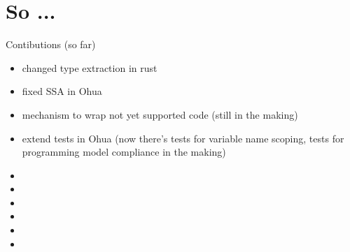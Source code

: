 \section{So ... }

Contibutions (so far)
\begin{itemize}
    \item changed type extraction in rust
    \item fixed SSA in Ohua
    \item mechanism to wrap not yet supported code (still in the making)
    \item extend tests in Ohua (now there's tests for variable name scoping, tests for programming model compliance in the making)
    \item {}
    \item {}
    \item {}
    \item {}
    \item {}
    \item {}
\end{itemize}